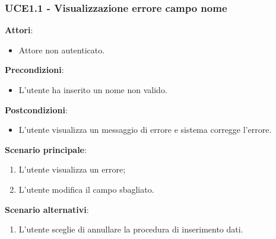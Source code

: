 \subsubsection{UCE1.1 - Visualizzazione errore campo nome}
\textbf{Attori}:
\begin{itemize}
    \item Attore non autenticato.
\end{itemize}
\textbf{Precondizioni}:
\begin{itemize}
    \item L'utente ha inserito un nome non valido.
\end{itemize}
\textbf{Postcondizioni}:
\begin{itemize}
    \item L'utente visualizza un messaggio di errore e sistema corregge l'errore.
\end{itemize}
\textbf{Scenario principale}:
\begin{enumerate}
    \item L'utente visualizza un errore;
    \item L'utente modifica il campo sbagliato.
\end{enumerate}
\textbf{Scenario alternativi}:
\begin{enumerate}
    \item L'utente sceglie di annullare la procedura di inserimento dati.
\end{enumerate}
